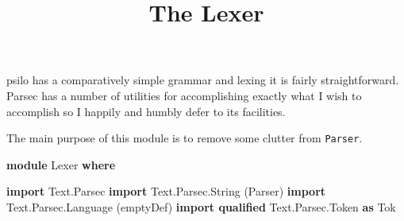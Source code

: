 \documentclass[]{article}
\title{The Lexer}
\date{}
\newenvironment{Shaded}{}{}
\newcommand{\KeywordTok}[1]{\textcolor[rgb]{0.00,0.44,0.13}{\textbf{{#1}}}}
\newcommand{\DataTypeTok}[1]{\textcolor[rgb]{0.56,0.13,0.00}{{#1}}}
\newcommand{\NormalTok}[1]{{#1}}
\begin{document}
\maketitle

psilo has a comparatively simple grammar and lexing it is fairly
straightforward. Parsec has a number of utilities for accomplishing
exactly what I wish to accomplish so I happily and humbly defer to its
facilities.

The main purpose of this module is to remove some clutter from
\texttt{Parser}.

\begin{Shaded}
\begin{Highlighting}[]
\KeywordTok{module} \DataTypeTok{Lexer} \KeywordTok{where}

\KeywordTok{import }\DataTypeTok{Text.Parsec}
\KeywordTok{import }\DataTypeTok{Text.Parsec.String} \NormalTok{(}\DataTypeTok{Parser}\NormalTok{)}
\KeywordTok{import }\DataTypeTok{Text.Parsec.Language} \NormalTok{(emptyDef)}
\KeywordTok{import qualified} \DataTypeTok{Text.Parsec.Token} \KeywordTok{as} \DataTypeTok{Tok}


\end{Highlighting}
\end{Shaded}
\end{document}
